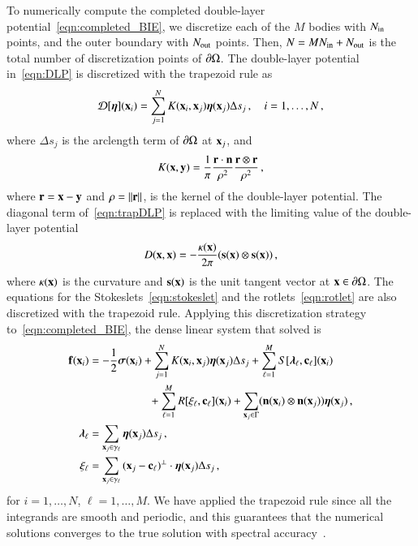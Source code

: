 \documentclass[preprint, 10pt]{elsarticle}
\begin{document}
To numerically compute the completed double-layer potential~\eqref{eqn:completed_BIE}, we discretize each of the $M$ bodies with  $N_{\mathrm{in}}$ points, and the outer boundary with $N_{\mathrm{out}}$ points.  Then, $N = MN_{\mathrm{in}} + N_{\mathrm{out}}$ is the total number of discretization points of ${\partial}\Omega$.  The double-layer potential in~\eqref{eqn:DLP} is discretized with the trapezoid rule as
\begin{align}
  {\mathcal{D}}[{\boldsymbol\eta}]({\mathbf{x}}_i) = \sum_{j=1}^{N} K({\mathbf{x}}_i,{\mathbf{x}}_j) {\boldsymbol\eta}({\mathbf{x}}_j) 
      \Delta s_{j}\, , \quad i=1,\ldots,N \, ,
  \label{eqn:trapDLP}
\end{align}
where $\Delta s_j$ is the arclength term of ${\partial}\Omega$ at
${\mathbf{x}}_j$, and
\begin{align}
  K({\mathbf{x}},{\mathbf{y}}) = \frac{1}{\pi} \frac{{\mathbf{r}} \cdot {\mathbf{n}}}{\rho^2} 
      \frac{{\mathbf{r}} \otimes {\mathbf{r}}}{\rho^2} \, ,
\end{align}
where ${\mathbf{r}} = {\mathbf{x}} - {\mathbf{y}}$ and $\rho = \|{\mathbf{r}}\|$, is the kernel of the double-layer potential.  The diagonal term of~\eqref{eqn:trapDLP} is replaced with the limiting value of the double-layer potential
\begin{align}
  D({\mathbf{x}},{\mathbf{x}}) = -\frac{\kappa({\mathbf{x}})}{2\pi}({\mathbf{s}}({\mathbf{x}}) \otimes {\mathbf{s}}({\mathbf{x}})) \, ,
\end{align}
where $\kappa({\mathbf{x}})$ is the curvature and ${\mathbf{s}}({\mathbf{x}})$ is the unit tangent vector at ${\mathbf{x}} \in {\partial}\Omega$.  The equations for the Stokeslets~\eqref{eqn:stokeslet} and the rotlets~\eqref{eqn:rotlet} are also discretized with the trapezoid rule.  Applying this discretization strategy to~\eqref{eqn:completed_BIE}, the dense linear system that solved is
\begin{equation}
  \label{eqn:completed_BIE_discretized}
  \begin{aligned}
    {\mathbf{f}}({\mathbf{x}}_i) &= -\frac{1}{2}{\boldsymbol\sigma}({\mathbf{x}}_i) + \sum_{j=1}^{N} 
      K({\mathbf{x}}_i,{\mathbf{x}}_j) {\boldsymbol\eta}({\mathbf{x}}_j) \Delta s_{j} + 
      \sum_{\ell=1}^M S[{\boldsymbol\lambda}_\ell,{\mathbf{c}}_\ell]({\mathbf{x}}_i) \\
      &\hspace{53pt}
      +\sum_{\ell=1}^M R[\xi_\ell,{\mathbf{c}}_\ell]({\mathbf{x}}_i) 
      +\sum_{{\mathbf{x}}_j \in \Gamma} ({\mathbf{n}}({\mathbf{x}}_i) \otimes
      {\mathbf{n}}({\mathbf{x}}_j)){\boldsymbol\eta}({\mathbf{x}}_j) \, , \\
    {\boldsymbol\lambda}_\ell &= \sum_{{\mathbf{x}}_j \in \gamma_\ell} {\boldsymbol\eta}({\mathbf{x}}_j) 
      \Delta s_j \, , \\ 
    \xi_\ell &= \sum_{{\mathbf{x}}_j \in \gamma_\ell}
      {({\mathbf{x}}_j - {\mathbf{c}}_\ell)}^\perp \cdot {\boldsymbol\eta}({\mathbf{x}}_j) \Delta s_j \, ,
  \end{aligned}
\end{equation}
for $i=1,\ldots,N$, $\ell=1,\ldots,M$.  We have applied the trapezoid rule since all the integrands are smooth and periodic, and this guarantees that the numerical solutions converges to the true solution with spectral accuracy~\cite{tre-wei2014}.
\end{document}

